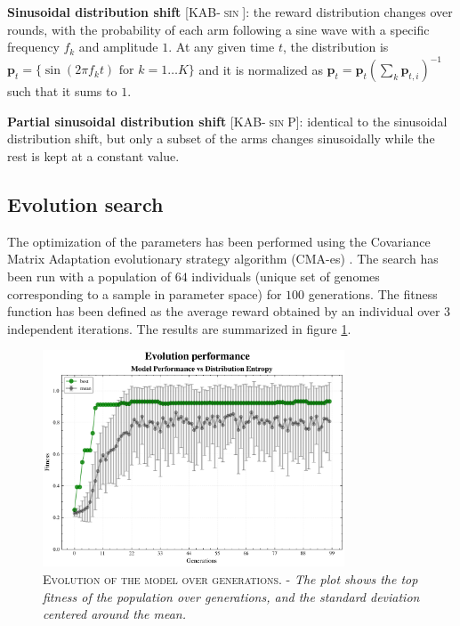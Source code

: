 \noindent \textbf{Sinusoidal distribution shift} [\textsc{KAB-$\sin$}]: the reward distribution changes over rounds, with the probability of each arm following a sine wave with a specific frequency $f_{k}$ and amplitude $1$. At any given time $t$, the distribution is $\mathbf{p}_{t}=\{\sin(2\pi f_{k}
t)\text{  for }k=1\ldots K\}$ and it is
normalized as $\mathbf{p}_{t} = \mathbf{p}_{t}(\sum_{k} \mathbf{p}_{t,i})^{-1}$ such that it sums to $1$.

\noindent \textbf{Partial sinusoidal distribution shift} [\textsc{KAB-$\sin$P}]: identical to the sinusoidal distribution shift, but only a subset of the arms changes sinusoidally while the rest is kept at a constant value.


\subsection{Evolution search}
The optimization of the parameters has been performed using the Covariance Matrix Adaptation evolutionary strategy algorithm (CMA-es) \cite{igelCovarianceMatrixAdaptation2007}.
The search has been run with a population of $64$ individuals (unique set of genomes corresponding to a sample in parameter space) for $100$ generations. The fitness function has been defined as the average reward obtained by an individual over 3 independent iterations.
The results are summarized in figure \ref{fig:evolution}.

\begin{figure}[h]
    \centering
    \includegraphics[width=0.8\textwidth]{figures/evolution_plot.png}
    \caption{\textsc{Evolution of the model over generations.} - \textit{The plot shows the top fitness of the population over generations, and the standard deviation centered around the mean.}}
    \label{fig:evolution}
\end{figure}


